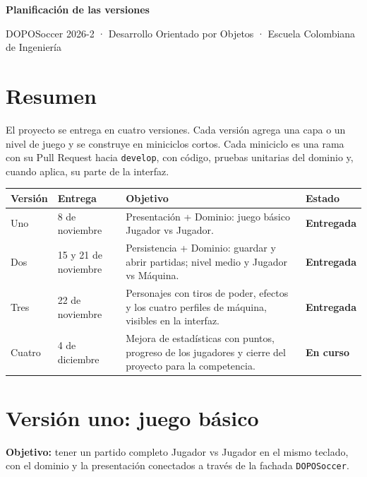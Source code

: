 \documentclass[11pt,letterpaper]{article}
\newcommand{\encabezado}{\rowcolor{encabezado}}
\newcommand{\codigo}[1]{\texttt{#1}}
\begin{document}
{\LARGE\bfseries Planificación de las versiones\par}
\vspace{2pt}
{\color{gris} DOPOSoccer 2026-2 · Desarrollo Orientado por Objetos · Escuela Colombiana de Ingeniería\par}
\vspace{6pt}

\section{Resumen}

El proyecto se entrega en cuatro versiones. Cada versión agrega una capa o un nivel de juego y se construye en miniciclos cortos. Cada miniciclo es una rama con su Pull Request hacia \codigo{develop}, con código, pruebas unitarias del dominio y, cuando aplica, su parte de la interfaz.

{\small
\begin{xltabular}{\linewidth}{|L{1.4cm}|L{2.9cm}|Y|L{1.7cm}|}
\hline
\encabezado \textbf{Versión} & \textbf{Entrega} & \textbf{Objetivo} & \textbf{Estado} \\ \hline
\endhead
Uno & 8 de noviembre & Presentación + Dominio: juego básico Jugador vs Jugador. & \textbf{Entregada} \\ \hline
Dos & 15 y 21 de noviembre & Persistencia + Dominio: guardar y abrir partidas; nivel medio y Jugador vs Máquina. & \textbf{Entregada} \\ \hline
Tres & 22 de noviembre & Personajes con tiros de poder, efectos y los cuatro perfiles de máquina, visibles en la interfaz. & \textbf{Entregada} \\ \hline
Cuatro & 4 de diciembre & Mejora de estadísticas con puntos, progreso de los jugadores y cierre del proyecto para la competencia. & \textbf{En curso} \\ \hline
\end{xltabular}
}

\section{Versión uno: juego básico}

\textbf{Objetivo:} tener un partido completo Jugador vs Jugador en el mismo teclado, con el dominio y la presentación conectados a través de la fachada \codigo{DOPOSoccer}.
\end{document}
